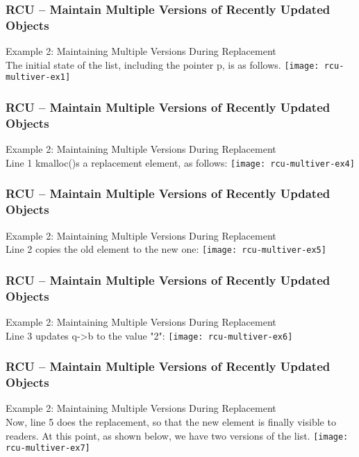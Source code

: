 \begin{frame}[fragile]
    \frametitle{RCU -- Maintain Multiple Versions of Recently Updated Objects}
    \Large
    Example 2: Maintaining Multiple Versions During Replacement \\
    
    The initial state of the list, including the pointer p, is as follows. 
    \texttt{[image: rcu-multiver-ex1]}
\end{frame}

\begin{frame}[fragile]
    \frametitle{RCU -- Maintain Multiple Versions of Recently Updated Objects}
    \Large
    Example 2: Maintaining Multiple Versions During Replacement \\
    
    Line 1 kmalloc()s a replacement element, as follows: 
    \texttt{[image: rcu-multiver-ex4]}
\end{frame}


\begin{frame}[fragile]
    \frametitle{RCU -- Maintain Multiple Versions of Recently Updated Objects}
    \Large
    Example 2: Maintaining Multiple Versions During Replacement \\
    
    Line 2 copies the old element to the new one:  
    \texttt{[image: rcu-multiver-ex5]}
\end{frame}

\begin{frame}[fragile]
    \frametitle{RCU -- Maintain Multiple Versions of Recently Updated Objects}
    \Large
    Example 2: Maintaining Multiple Versions During Replacement \\
    
    Line 3 updates q->b to the value "2":  
    \texttt{[image: rcu-multiver-ex6]}
\end{frame}


\begin{frame}[fragile]
    \frametitle{RCU -- Maintain Multiple Versions of Recently Updated Objects}
    \large
    Example 2: Maintaining Multiple Versions During Replacement \\
    
    Now, line 5 does the replacement, so that the new element is finally visible to readers. At this point, as shown below, we have two versions of the list. 
    \texttt{[image: rcu-multiver-ex7]}
\end{frame}


